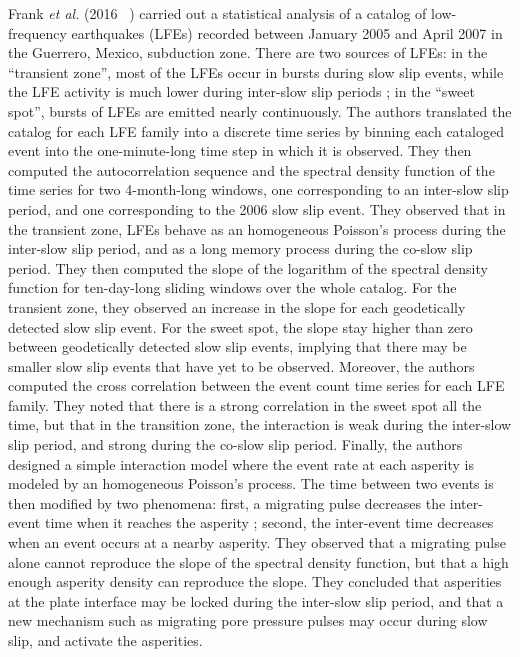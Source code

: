 \documentclass[main.tex]{subfiles}
\begin{document}
Frank \textit{et al.} (2016 ~\cite{FRA_2016}) carried out a statistical analysis of a catalog of low-frequency earthquakes (LFEs) recorded between January 2005 and April 2007 in the Guerrero, Mexico, subduction zone. There are two sources of LFEs: in the ``transient zone'', most of the LFEs occur in bursts during slow slip events, while the LFE activity is much lower during inter-slow slip periods ; in the ``sweet spot'', bursts of LFEs are emitted nearly continuously. The authors translated the catalog for each LFE family into a discrete time series by binning each cataloged event into the one-minute-long time step in which it is observed. They then computed the autocorrelation sequence and the spectral density function of the time series for two 4-month-long windows, one corresponding to an inter-slow slip period, and one corresponding to the 2006 slow slip event. They observed that in the transient zone, LFEs behave as an homogeneous Poisson's process during the inter-slow slip period, and as a long memory process during the co-slow slip period. They then computed the slope of the logarithm of the spectral density function for ten-day-long sliding windows over the whole catalog. For the transient zone, they observed an increase in the slope for each geodetically detected slow slip event. For the sweet spot, the slope stay higher than zero between geodetically detected slow slip events, implying that there may be smaller slow slip events that have yet to be observed. Moreover, the authors computed the cross correlation between the event count time series for each LFE family. They noted that there is a strong correlation in the sweet spot all the time, but that in the transition zone, the interaction is weak during the inter-slow slip period, and strong during the co-slow slip period. Finally, the authors designed a simple interaction model where the event rate at each asperity is modeled by an homogeneous Poisson's process. The time between two events is then modified by two phenomena: first, a migrating pulse decreases the inter-event time when it reaches the asperity ; second, the inter-event time decreases when an event occurs at a nearby asperity. They observed that a migrating pulse alone cannot reproduce the slope of the spectral density function, but that a high enough asperity density can reproduce the slope. They concluded that asperities at the plate interface may be locked during the inter-slow slip period, and that a new mechanism such as migrating pore pressure pulses may occur during slow slip, and activate the asperities. \\
\end{document}

